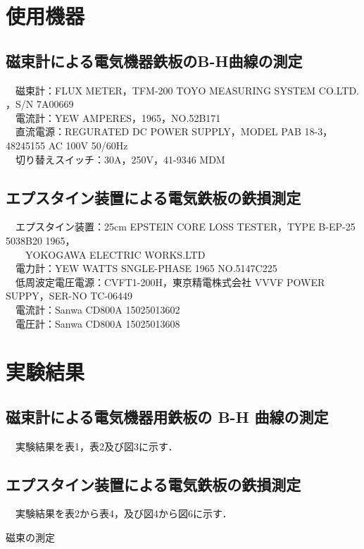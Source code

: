 \section{使用機器}
\subsection{磁束計による電気機器鉄板のB-H曲線の測定}
　磁束計：FLUX METER，TFM-200 TOYO MEASURING SYSTEM CO.LTD. ，S/N 7A00669\\
　電流計：YEW AMPERES，1965，NO.52B171\\
　直流電源：REGURATED DC POWER SUPPLY，MODEL PAB 18-3，48245155 AC 100V 50/60Hz\\
　切り替えスイッチ：30A，250V，41-9346 MDM\\

\subsection{エプスタイン装置による電気鉄板の鉄損測定}
　エプスタイン装置：25cm EPSTEIN CORE LOSS TESTER，TYPE B-EP-25 5038B20 1965，\\　　YOKOGAWA ELECTRIC WORKS.LTD\\
　電力計：YEW WATTS SNGLE-PHASE 1965 NO.5147C225\\
　低周波定電圧電源：CVFT1-200H，東京精電株式会社 VVVF POWER SUPPY，SER-NO TC-06449\\
　電流計：Sanwa CD800A 15025013602\\
　電圧計：Sanwa CD800A 15025013608\\


\section{実験結果}
\subsection{磁束計による電気機器用鉄板の B-H 曲線の測定}
　実験結果を表1，表2及び図3に示す．\\

\subsection{エプスタイン装置による電気鉄板の鉄損測定}
　実験結果を表2から表4，及び図4から図6に示す．

\begin{landscape}
  \begin{table}[p]
    \centering
    \small
    \caption{磁束の測定}
    \scalebox{0.61} {
      
    }
  \end{table}
\end{landscape}

